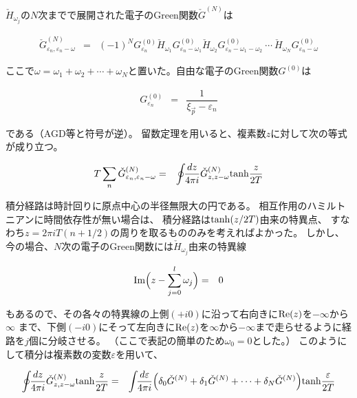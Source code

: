 \documentclass[uplatex,a4j,12pt,dvipdfmx]{jsarticle}
\begin{document}
$\check{H}_{\omega_{j}}$の$N$次までで展開された電子のGreen関数$\check{G}^{(N)}$は

\begin{eqnarray}
	\check{G}^{(N)}_{\varepsilon_{n},\varepsilon_{n} - \omega}
	&=&
	(-1)^{N}
	G^{(0)}_{\varepsilon_{n}}
	\check{H}_{\omega_{1}}
	G^{(0)}_{\varepsilon_{n} - \omega_{1}}
	\check{H}_{\omega_{2}}
	G^{(0)}_{\varepsilon_{n} - \omega_{1} - \omega_{2} }
	\ \cdots \
	\check{H}_{\omega_{N}}
	G^{(0)}_{\varepsilon_{n} - \omega }
\end{eqnarray}

ここで$\omega = \omega_{1} + \omega_{2} + \cdots + \omega_{N}$と置いた。自由な電子のGreen関数$G^{(0)}$は

\begin{eqnarray}
	G^{(0)}_{\varepsilon_{n}}
	&=&
	\dfrac{1}{ \xi_{\vec{p}} - \varepsilon_{n} }
\end{eqnarray}

である（AGD等と符号が逆）。
留数定理を用いると、複素数$z$に対して次の等式が成り立つ。

\begin{eqnarray}
	T \sum_{n} \check{G}^{(N)}_{\varepsilon_{n},\varepsilon_{n} - \omega}
	&=&
	\oint \!\! \dfrac{dz}{4 \pi i}
	\check{G}^{(N)}_{z,z - \omega}
	{\rm tanh} \dfrac{z}{2 T}
\end{eqnarray}

積分経路は時計回りに原点中心の半径無限大の円である。
相互作用のハミルトニアンに時間依存性が無い場合は、
積分経路は${\rm tanh}(z/2 T)$由来の特異点、
すなわち$z=2 \pi i T (n + 1/2)$の周りを取るもののみを考えればよかった。
しかし、今の場合、$N$次の電子のGreen関数には$\check{H}_{\omega_{j}}$由来の特異線

\begin{eqnarray}
	{\rm Im}
	\Big( z - \sum^{l}_{j = 0} \omega_{j} \Big)
	&=&
	0
	\label{eqn:tokuisen}
\end{eqnarray}

もあるので、その各々の特異線の上側$(+i0)$に沿って右向きに${\rm Re}(z)$を$- \infty$から$\infty$
まで、下側$(-i0)$にそって左向きに${\rm Re}(z)$を$\infty$から$-\infty$まで走らせるように経路を$j$個に分岐させる。
（ここで表記の簡単のため$\omega_{0}=0$とした。）
このようにして積分は複素数の変数$\varepsilon$を用いて、

\begin{eqnarray}
	\oint \!\! \dfrac{dz}{4 \pi i}
	\check{G}^{(N)}_{z,z - \omega}
	{\rm tanh} \dfrac{z}{2 T}
	&=&
	\int \! \! \dfrac{d \varepsilon}{4 \pi i}
	\Big(
	\delta_{0} \check{G}^{(N)}
	+
	\delta_{1} \check{G}^{(N)}
	+
	\cdots
	+
	\delta_{N} \check{G}^{(N)}
	\Big)
	{\rm tanh} \dfrac{\varepsilon}{2 T}
\end{eqnarray}
\end{document}
